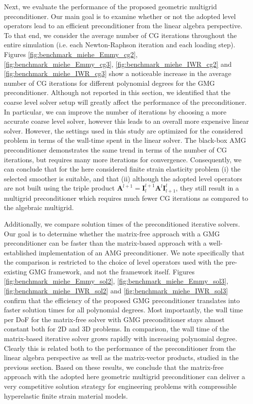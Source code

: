 \documentclass[times,doublespace]{nmeauth}
\newcommand*{\gz}[1]{\boldsymbol{#1}}
\begin{document}
Next, we evaluate the performance of the proposed geometric multigrid preconditioner.
Our main goal is to examine whether or not the adopted level operators lead to an efficient preconditioner from the linear algebra perspective. To that end,
we consider the average number of CG iterations throughout the entire simulation (i.e. each Newton-Raphson iteration and each loading step).
Figures \ref{fig:benchmark_miehe_Emmy_cg2}, \ref{fig:benchmark_miehe_Emmy_cg3}, \ref{fig:benchmark_miehe_IWR_cg2} and \ref{fig:benchmark_miehe_IWR_cg3} show a
 noticeable increase in the average number of CG iterations for different polynomial degrees
 for the GMG preconditioner.
Although not reported in this section, we identified that
the coarse level solver setup will greatly affect the performance of the preconditioner.
In particular, we can improve the number of iterations by choosing a more accurate coarse level solver,
however this leads to an overall more expensive linear solver.
However, the settings used in this study are optimized for the considered problem in terms of the wall-time spent in the linear solver.
The black-box AMG preconditioner
demonstrates the same trend in terms of the number of CG iterations, but
requires many more iterations for convergence.
Consequently, we can conclude that for the here considered finite strain elasticity problem (i) the selected smoother is suitable, and that (ii) although the adopted level operators are not built using the triple product $\gz A^{l+1}=\gz I^{l+1}_{l} \gz A^l \gz I^l_{l+1}$, they still result in a multigrid preconditioner which requires much fewer CG iterations as compared to the algebraic multigrid.

Additionally, we compare solution times of the preconditioned iterative solvers.
Our goal is to determine whether the matrix-free approach with a GMG preconditioner can be faster than the matrix-based approach with a well-established implementation of an AMG preconditioner.
We note specifically that the comparison is restricted to the choice of level operators used with the pre-existing GMG framework, and not the framework itself.
Figures \ref{fig:benchmark_miehe_Emmy_sol2}, \ref{fig:benchmark_miehe_Emmy_sol3}, \ref{fig:benchmark_miehe_IWR_sol2} and \ref{fig:benchmark_miehe_IWR_sol3} confirm that the efficiency of the proposed GMG preconditioner translates into faster solution times for all polynomial degrees.
Most importantly, the wall time per DoF for the matrix-free solver with GMG preconditioner stays almost constant both for 2D and 3D problems.
In comparison, the wall time of the matrix-based iterative solver grows rapidly with increasing polynomial degree.
Clearly this is related both to the performance of the preconditioner from the linear algebra perspective as well as the matrix-vector products, studied in the previous section.
Based on these results, we conclude that the matrix-free approach with the adopted here geometric multigrid preconditioner can deliver a very competitive solution strategy for engineering problems
with compressible hyperelastic finite strain material models.
\end{document}
